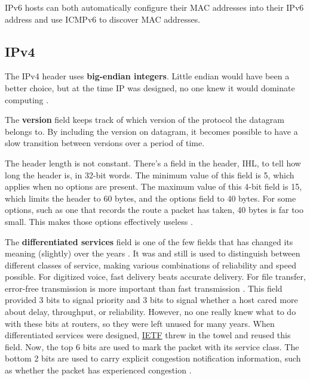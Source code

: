 IPv6 hosts can both automatically configure their MAC addresses into their IPv6 address and use ICMPv6 to discover MAC addresses.

\subsection{IPv4}

The IPv4 header uses \textbf{big-endian integers}. Little endian would have been a better choice, but at the time IP was designed, no one knew it would dominate computing \cite{computer-networks-tanenbaum-2012}.

The \textbf{version} field keeps track of which version of the protocol the datagram belongs to. By including the version on datagram, it becomes possible to have a slow transition between versions over a period of time.

The header length is not constant. There's a field in the header, IHL, to tell how long the header is, in 32-bit words. The minimum value of this field is 5, which applies when no options are present.
The maximum value of this 4-bit field is 15, which limits the header to 60 bytes, and the options field to 40 bytes. For some options, such as one that records the route a packet has taken, 40 bytes is far too small.
This makes those options effectively useless \cite{computer-networks-tanenbaum-2012}.

The \textbf{differentiated services} field is one of the few fields that has changed its meaning (slightly) over the years \cite{computer-networks-tanenbaum-2012}.
It was and still is used to distinguish between different classes of service, making various combinations of reliability and speed possible.
For digitized voice, fast delivery beats accurate delivery.
For file transfer, error-free transmission is more important than fast transmission \cite{computer-networks-tanenbaum-2012}.
This field provided 3 bits to signal priority and 3 bits to signal whether a host cared more about delay, throughput, or reliability.
However, no one really knew what to do with these bits at routers, so they were left unused for many years.
When differentiated services were designed, \href{https://en.wikipedia.org/wiki/Internet_Engineering_Task_Force}{IETF} threw in the towel and reused this field.
Now, the top 6 bits are used to mark the packet with its service class.
The bottom 2 bits are used to carry explicit congestion notification information, such as whether the packet has experienced congestion \cite{computer-networks-tanenbaum-2012}.

